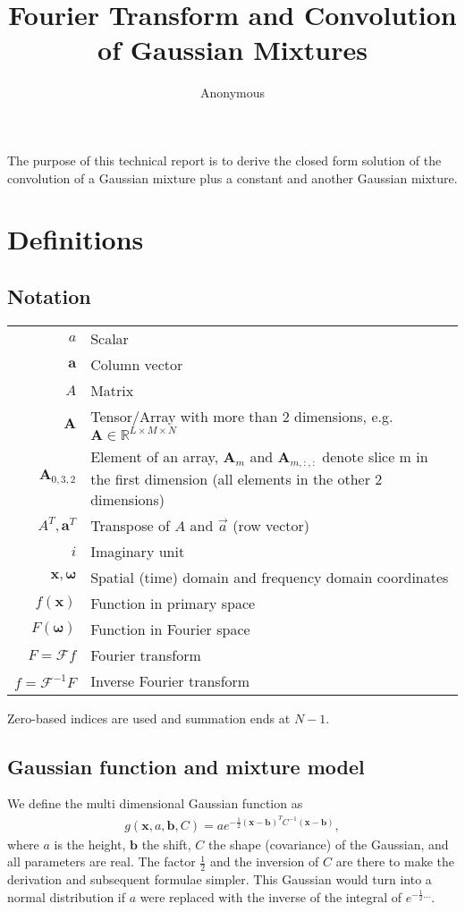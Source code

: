 \documentclass{paper}
\title{Fourier Transform and Convolution of Gaussian Mixtures}
\author{Anonymous}
\newcommand{\F}{\ensuremath{\mathcal{F}}}
\newcommand{\vr}[1]{\ensuremath{\boldsymbol{#1}}}
\newcommand{\tr}[1]{\ensuremath{\boldsymbol{#1}}}
\newcommand{\f}[1]{#1}
\begin{document}
\maketitle


The purpose of this technical report is to derive the closed form solution of the convolution of a Gaussian mixture plus a constant and another Gaussian mixture.

\section{Definitions}
\subsection*{Notation}
\begin{center}
	\begin{supertabular}{rp{8cm}}
		$a$	& Scalar \\
		$\vr{a}$	& Column vector \\
		$A$			& Matrix \\ 
		$\tr{A}$	& Tensor/Array with more than 2 dimensions, e.g. $\tr{A} \in \mathbb{R}^{L \times M \times N}$ \\ 
		$\tr{A}_{0, 3, 2}$
					& Element of an array, $\tr{A}_{m}$ and $\tr{A}_{m, :, :}$ denote slice m in the first dimension (all elements in the other 2 dimensions)\\ 
		$A^T, \vr{a}^T$
					& Transpose of $A$ and $\vec{a}$ (row vector) \\
		$i$			& Imaginary unit \\
		$\vr{x}, \vr{\omega}$
					& Spatial (time) domain and frequency domain coordinates \\
		$\f{f}(\vr{x})$
					& Function in primary space \\
		$\f{F}(\vr{\omega})$
					& Function in Fourier space \\
		$\f{F} = \F \f{f}$
					& Fourier transform \\
		$\f{f} = \F^{-1} \f{F}$
					& Inverse Fourier transform \\
	\end{supertabular}
\end{center}
Zero-based indices are used and summation ends at $N-1$.

\subsection*{Gaussian function and mixture model}
We define the multi dimensional Gaussian function as
\begin{align}
\label{eq:gaussian_definition}
g(\vr{x}, a, \vr{b}, C) = a e^{-\frac{1}{2}(\vr{x}-\vr{b})^TC^{-1}(\vr{x}-\vr{b})},
\end{align}
where $a$ is the height, $\vr{b}$ the shift, $C$ the shape (covariance) of the Gaussian, and all parameters are real.
The factor $\frac{1}{2}$ and the inversion of $C$ are there to make the derivation and subsequent formulae simpler.
This Gaussian would turn into a normal distribution if $a$ were replaced with the inverse of the integral of $e^{-\frac{1}{2}...}$.
\end{document}
